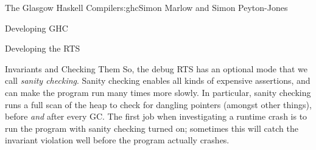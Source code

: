 \begin{aosachapter}{The Glasgow Haskell Compiler}{s:ghc}{Simon Marlow and Simon Peyton-Jones}
\begin{aosasect1}{Developing GHC}
\begin{aosasect2}{Developing the RTS}
\begin{aosasect3}{Invariants and Checking Them}
So, the debug RTS has an optional mode that we call \emph{sanity
  checking}.  Sanity checking enables all kinds of expensive
assertions, and can make the program run many times more slowly.  In
particular, sanity checking runs a full scan of the heap to check for
dangling pointers (amongst other things), before \emph{and} after
every GC.  The first job when investigating a runtime crash is to run
the program with sanity checking turned on; sometimes this will catch
the invariant violation well before the program actually crashes.

\end{aosasect3}

\end{aosasect2}

\end{aosasect1}

\end{aosachapter}
